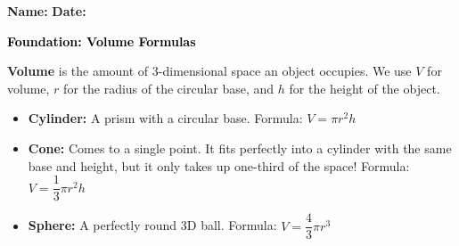 \documentclass[12pt, letterpaper, fleqn]{article}
\begin{document}
\textbf{Name:} \underline{\hspace{5cm}}
\hfill
\textbf{Date:} \underline{\hspace{3cm}}\\

\begin{tcolorbox}[colback=customteal!20]
    \large\textcolor{black}{\textbf{Foundation: Volume Formulas}}
\end{tcolorbox}

\vspace{3mm}

\noindent
\textbf{Volume} is the amount of 3-dimensional space an object occupies. We use $V$ for volume, $r$ for the radius of the circular base, and $h$ for the height of the object.

\begin{itemize}
    \item \textbf{Cylinder:} A prism with a circular base. Formula: $V = \pi r^2 h$
    \item \textbf{Cone:} Comes to a single point. It fits perfectly into a cylinder with the same base and height, but it only takes up one-third of the space! Formula: $V = \dfrac{1}{3}\pi r^2 h$
    \item \textbf{Sphere:} A perfectly round 3D ball. Formula: $V = \dfrac{4}{3}\pi r^3$
\end{itemize}

\vspace{4mm}
\end{document}
